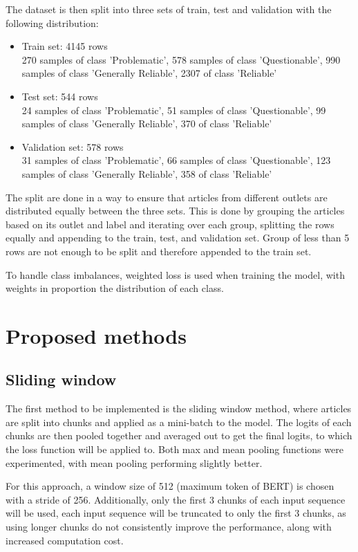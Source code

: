 The dataset is then split into three sets of train, test and validation with the following distribution:
\begin{itemize}
    \item Train set: 4145 rows \\
          270 samples of class 'Problematic', 578 samples of class 'Questionable', 990 samples of class 'Generally Reliable', 2307 of class 'Reliable'
    \item Test set: 544 rows \\
          24 samples of class 'Problematic', 51 samples of class 'Questionable', 99 samples of class 'Generally Reliable', 370 of class 'Reliable'
    \item Validation set: 578 rows \\
          31 samples of class 'Problematic', 66 samples of class 'Questionable', 123 samples of class 'Generally Reliable', 358 of class 'Reliable'
\end{itemize}

The split are done in a way to ensure that articles from different outlets are distributed equally between the three sets. This is done by grouping the articles based on its outlet and label and iterating over each group, splitting the rows equally and appending to the train, test, and validation set. Group of less than 5 rows are not enough to be split and therefore appended to the train set.

To handle class imbalances, weighted loss is used when training the model, with weights in proportion the distribution of each class.

\section{Proposed methods}

\subsection{Sliding window}

The first method to be implemented is the sliding window method, where articles are split into chunks and applied as a mini-batch to the model. The logits of each chunks are then pooled together and averaged out to get the final logits, to which the loss function will be applied to. Both max and mean pooling functions were experimented, with mean pooling performing slightly better.

For this approach, a window size of 512 (maximum token of BERT) is chosen with a stride of 256. Additionally, only the first 3 chunks of each input sequence will be used, each input sequence will be truncated to only the first 3 chunks, as using longer chunks do not consistently improve the performance, along with increased computation cost.

